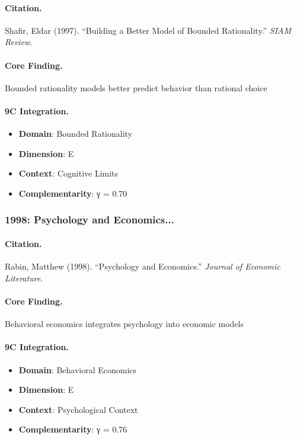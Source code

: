 \paragraph{Citation.}
Shafir, Eldar (1997). ``Building a Better Model of Bounded Rationality.''
\textit{SIAM Review}.

\paragraph{Core Finding.}
Bounded rationality models better predict behavior than rational choice

\paragraph{9C Integration.}
\begin{itemize}[nosep]
  \item \textbf{Domain}: Bounded Rationality
  \item \textbf{Dimension}: E
  \item \textbf{Context}: Cognitive Limits
  \item \textbf{Complementarity}: γ = 0.70
\end{itemize}

\subsubsection{1998: Psychology and Economics...}

\paragraph{Citation.}
Rabin, Matthew (1998). ``Psychology and Economics.''
\textit{Journal of Economic Literature}.

\paragraph{Core Finding.}
Behavioral economics integrates psychology into economic models

\paragraph{9C Integration.}
\begin{itemize}[nosep]
  \item \textbf{Domain}: Behavioral Economics
  \item \textbf{Dimension}: E
  \item \textbf{Context}: Psychological Context
  \item \textbf{Complementarity}: γ = 0.76
\end{itemize}

